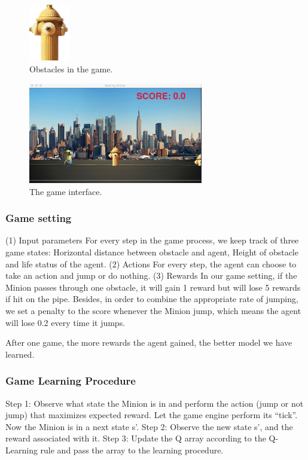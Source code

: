 \documentclass{acmsiggraph}
\begin{document}
\begin{figure}[ht]
  \centering
  \includegraphics[width=50pt]{../fig/obstacle.png}
  \caption{Obstacles in the game.}
  \label{fig:obstacle}
\end{figure}


\begin{figure}[ht]
  \centering
  \includegraphics[width=3.0in]{../fig/interface.jpg}
  \caption{The game interface.}
  \label{fig:interface}
\end{figure}

\subsubsection{Game setting}
(1) Input parameters
For every step in the game process, we keep track of three game states: Horizontal distance between obstacle and agent, Height of obstacle and life status of the agent.
(2) Actions
For every step, the agent can choose to take an action and jump or do nothing.
(3) Rewards
In our game setting, if the Minion passes through one obstacle, it will gain 1 reward but will lose 5 rewards if hit on the pipe. Besides, in order to combine the appropriate rate of jumping, we set a penalty to the score whenever the Minion jump, which means the agent will lose 0.2 every time it jumps. 

After one game, the more rewards the agent gained, the better model we have learned.

\subsubsection{Game Learning Procedure}

Step 1: Observe what state the Minion is in and perform the action (jump or not jump) that maximizes expected reward. Let the game engine perform its “tick”. Now the Minion is in a next state s’.
Step 2: Observe the new state s’, and the reward associated with it.
Step 3: Update the Q array according to the Q-Learning rule and pass the array to the learning procedure.
\end{document}
